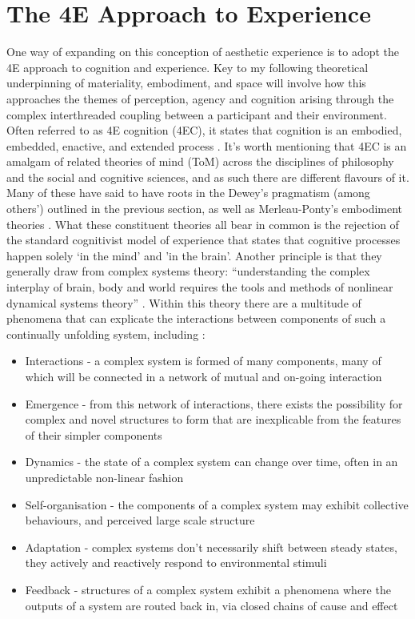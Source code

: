\section{The 4E Approach to Experience}
One way of expanding on this conception of aesthetic experience is to adopt the 4E approach to cognition and experience. Key to my following theoretical underpinning of materiality, embodiment, and space will involve how this approaches the themes of perception, agency and cognition arising through the complex interthreaded coupling between a participant and their environment. Often referred to as 4E cognition (4EC), it states that cognition is an embodied, embedded, enactive, and extended process \citep{gallagher2017}. It’s worth mentioning that 4EC is an amalgam of related theories of mind (ToM) across the disciplines of philosophy and the social and cognitive sciences, and as such there are different flavours of it. Many of these have said to have roots in the Dewey’s pragmatism (among others’) outlined in the previous section, as well as Merleau-Ponty’s embodiment theories \citep{zavota2016}. What these constituent theories all bear in common is the rejection of the standard cognitivist model of experience that states that cognitive processes happen solely ‘in the mind’ and ’in the brain’. Another principle is that they generally draw from complex systems theory: “understanding the complex interplay of brain, body and world requires the tools and methods of nonlinear dynamical systems theory” \citep{clark1999}. Within this theory there are a multitude of phenomena that can explicate the interactions between components of such a continually unfolding system, including \citep{dedomenico2019}:
\begin{itemize}
    \item Interactions - a complex system is formed of many components, many of which will be connected in a network of mutual and on-going interaction
    \item Emergence - from this network of interactions, there exists the possibility for complex and novel structures to form that are inexplicable from the features of their simpler components 
    \item Dynamics - the state of a complex system can change over time, often in an unpredictable non-linear fashion
    \item Self-organisation - the components of a complex system may exhibit collective behaviours, and perceived large scale structure
    \item Adaptation - complex systems don’t necessarily shift between steady states, they actively and reactively respond to environmental stimuli
    \item Feedback - structures of a complex system exhibit a phenomena where the outputs of a system are routed back in, via closed chains of cause and effect 
\end{itemize}


